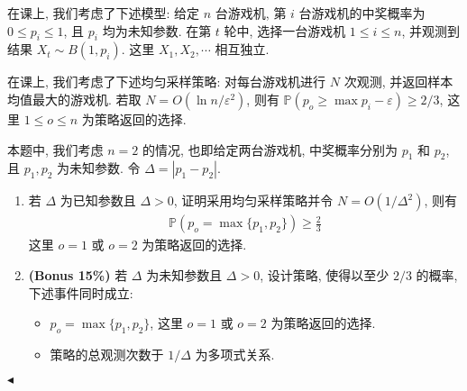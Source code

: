 \documentclass[11pt]{article}
\newenvironment{problem}[2][Problem]{\begin{trivlist}
    \item[\hskip \labelsep {\bfseries #1}\hskip \labelsep {\bfseries #2.}]\songti}{\hfill$\blacktriangleleft$\end{trivlist}}
\newcommand\1{\mathds{1}}
\newcommand\PP{\mathbb{P}}
\begin{document}
\begin{problem}{5}
    在课上, 我们考虑了下述模型: 给定 $n$ 台游戏机, 第 $i$ 台游戏机的中奖概率为 $0\le p_i \le 1$, 且 $p_i$ 均为未知参数.
    在第 $t$ 轮中, 选择一台游戏机 $1\le i\le n$, 并观测到结果 $X_{t} \sim B(1, p_i)$. 这里 $X_1, X_2, \cdots $ 相互独立.

    在课上, 我们考虑了下述均匀采样策略: 对每台游戏机进行 $N$ 次观测, 并返回样本均值最大的游戏机. 
    若取 $N = O(\ln n/\varepsilon^2)$, 则有 $\PP(p_o \ge \max p_i - \varepsilon) \ge 2/3$, 
    这里 $1\le o\le n$ 为策略返回的选择.

    本题中, 我们考虑 $n=2$ 的情况, 也即给定两台游戏机, 中奖概率分别为 $p_1$ 和 $p_2$, 且 $p_1, p_2$ 为未知参数. 令 $\Delta = |p_1 - p_2|$.
    \begin{enumerate}[label=(\arabic*)]
        \item 若 $\Delta$ 为已知参数且 $\Delta > 0$, 证明采用均匀采样策略并令 $N=O(1/\Delta^2)$, 则有 
        \begin{align*}
            \PP\left(p_o = \max\{p_1, p_2\}\right) \ge \frac{2}{3}
        \end{align*}
        这里 $o=1$ 或 $o=2$ 为策略返回的选择.
        \item \textbf{(Bonus 15\%)} 若 $\Delta$ 为未知参数且 $\Delta > 0$, 设计策略, 使得以至少 $2/3$ 的概率, 下述事件同时成立:
        \begin{itemize}
            \item $p_o = \max\{p_1, p_2\}$, 这里 $o=1$ 或 $o=2$ 为策略返回的选择.
            \item 策略的总观测次数于 $1/\Delta$ 为多项式关系.
        \end{itemize}
    \end{enumerate}
\end{problem}
\end{document}
